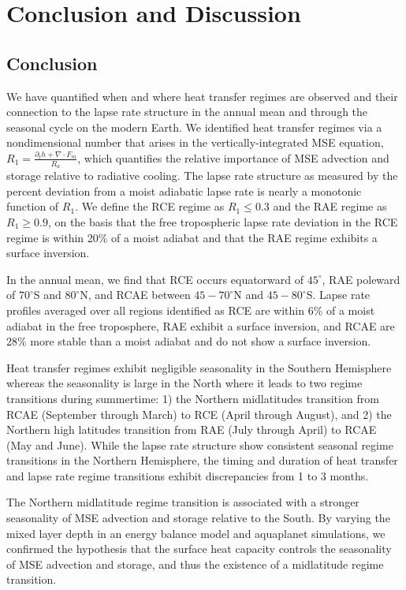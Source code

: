 \documentclass{ametsocV5}
\begin{document}
\section{Conclusion and Discussion}

\subsection{Conclusion}

We have quantified when and where heat transfer regimes are observed and their connection to the lapse rate structure in the annual mean and through the seasonal cycle on the modern Earth. We identified heat transfer regimes via a nondimensional number that arises in the vertically-integrated MSE equation, $R_1=\frac{\partial_t h + \nabla\cdot F_m}{R_a}$, which quantifies the relative importance of MSE advection and storage relative to radiative cooling. The lapse rate structure as measured by the percent deviation from a moist adiabatic lapse rate is nearly a monotonic function of $R_1$. We define the RCE regime as $R_1 \le 0.3$ and the RAE regime as $R_1 \ge 0.9$, on the basis that the free tropospheric lapse rate deviation in the RCE regime is within 20\% of a moist adiabat and that the RAE regime exhibits a surface inversion.

In the annual mean, we find that RCE occurs equatorward of $45^\circ$, RAE poleward of $70^\circ$S and $80^\circ$N, and RCAE between $45-70^\circ$N and $45-80^\circ$S. Lapse rate profiles averaged over all regions identified as RCE are within 6\% of a moist adiabat in the free troposphere, RAE exhibit a surface inversion, and RCAE are 28\% more stable than a moist adiabat and do not show a surface inversion.

Heat transfer regimes exhibit negligible seasonality in the Southern Hemisphere whereas the seasonality is large in the North where it leads to two regime transitions during summertime: 1) the Northern midlatitudes transition from RCAE (September through March) to RCE (April through August), and 2) the Northern high latitudes transition from RAE (July through April) to RCAE (May and June). While the lapse rate structure show consistent seasonal regime transitions in the Northern Hemisphere, the timing and duration of heat transfer and lapse rate regime transitions exhibit discrepancies from 1 to 3 months.

The Northern midlatitude regime transition is associated with a stronger seasonality of MSE advection and storage relative to the South. By varying the mixed layer depth in an energy balance model and aquaplanet simulations, we confirmed the hypothesis that the surface heat capacity controls the seasonality of MSE advection and storage, and thus the existence of a midlatitude regime transition.
\end{document}
